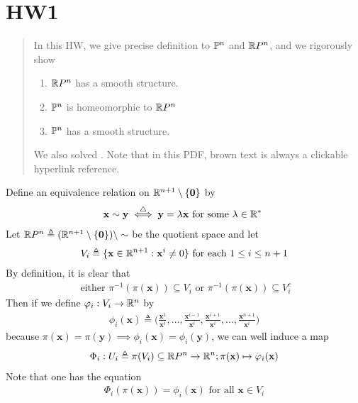 \documentclass{report}
\begin{document}
\section{HW1} 
\begin{abstract}
In this HW, we give precise definition to $\P^n$  and $\RP^n$, and we rigorously show
\begin{enumerate}[label=(\alph*)]
  \item $\RP^n$  has a smooth structure. 
  \item $\P^n$ is homeomorphic to $\RP^n$ 
   \item $\P^n$ has a smooth structure.
\end{enumerate}
We also solved  . Note that in this PDF, brown text is always a clickable hyperlink reference.  
\end{abstract}
\begin{mdframed}
Define an equivalence relation on $\R^{n+1}\setminus \set{\textbf{0}}$ by 
\begin{align*}
\textbf{x}\sim \textbf{y}\overset{\triangle}{\iff }\textbf{y}=\ld \textbf{x}\text{ for some $\ld \inr^*$ } 
\end{align*}
Let $\RP ^n\triangleq (\R^{n+1}\setminus \set{\textbf{0}})\setminus \sim $ be the quotient space and let  
\begin{align*}
V_i\triangleq \set{\textbf{x}\inr^{n+1}:\textbf{x}^i \neq 0}\text{ for each }1\leq i\leq n+1
\end{align*}
By definition, it is clear that 
\begin{align*}
\text{ either }\pi^{-1}(\pi (\textbf{x}))\subseteq V_i\text{ or }\pi^{-1}(\pi (\textbf{x}))\subseteq V_i^c
\end{align*}
Then if we define $\phi_i:V_i\rightarrow \R^n$ by
\begin{align*}
\phi_i(\textbf{x})\triangleq \Big(\frac{\textbf{x}^1}{\textbf{x}^i},\dots ,\frac{\textbf{x}^{i-1}}{\textbf{x}^i},\frac{\textbf{x}^{i+1}}{\textbf{x}^i},\dots,\frac{\textbf{x}^{n+1}}{\textbf{x}^i} \Big)
\end{align*}
because $\pi (\textbf{x})=\pi(\textbf{y})\implies \phi_i(\textbf{x})=\phi_i(\textbf{y})$, we can well induce a map 
\begin{align*}
\Phi_i:U_i\triangleq \pi (V_i)\subseteq \R P^n\rightarrow \R^n; \pi (\textbf{x})\mapsto \phi_i(\textbf{x})
\end{align*}
Note that one has the equation 
\begin{align*}
\Phi_i(\pi (\textbf{x}))= \phi_i(\textbf{x})\text{ for all }\textbf{x}\in V_i
\end{align*}
\end{mdframed}
\end{document}
